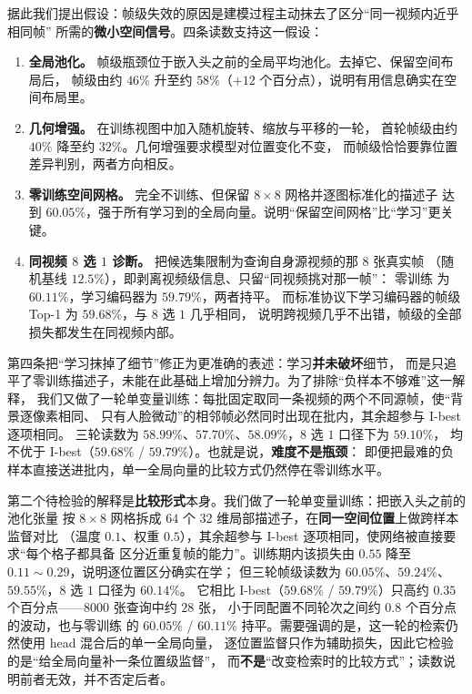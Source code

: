 据此我们提出假设：帧级失效的原因是建模过程主动抹去了区分“同一视频内近乎相同帧”
所需的\textbf{微小空间信号}。四条读数支持这一假设：

\begin{enumerate}[leftmargin=1.6em,itemsep=1pt]
\item \textbf{全局池化。} 帧级瓶颈位于嵌入头之前的全局平均池化。去掉它、保留空间布局后，
      帧级由约 $46\%$ 升至约 $58\%$（$+12$ 个百分点），说明有用信息确实在空间布局里。
\item \textbf{几何增强。} 在训练视图中加入随机旋转、缩放与平移的一轮，
      首轮帧级由约 $40\%$ 降至约 $32\%$。几何增强要求模型对位置变化不变，
      而帧级恰恰要靠位置差异判别，两者方向相反。
\item \textbf{零训练空间网格。} 完全不训练、但保留 $8\times8$ 网格并逐图标准化的描述子
      达到 $60.05\%$，强于所有学习到的全局向量。说明“保留空间网格”比“学习”更关键。
\item \textbf{同视频 $8$ 选 $1$ 诊断。} 把候选集限制为查询自身源视频的那 $8$ 张真实帧
      （随机基线 $12.5\%$），即剥离视频级信息、只留“同视频挑对那一帧”：
      零训练  为 $60.11\%$，学习编码器为 $59.79\%$，两者持平。
      而标准协议下学习编码器的帧级 Top-1 为 $59.68\%$，与 $8$ 选 $1$ 几乎相同，
      说明跨视频几乎不出错，帧级的全部损失都发生在同视频内部。
\end{enumerate}

第四条把“学习抹掉了细节”修正为更准确的表述：学习\textbf{并未破坏}细节，
而是只追平了零训练描述子，未能在此基础上增加分辨力。为了排除“负样本不够难”这一解释，
我们又做了一轮单变量训练：每批固定取同一条视频的两个不同源帧，使“背景逐像素相同、
只有人脸微动”的相邻帧必然同时出现在批内，其余超参与 I-best 逐项相同。
三轮读数为 $58.99\%$、$57.70\%$、$58.09\%$，$8$ 选 $1$ 口径下为 $59.10\%$，
均不优于 I-best（$59.68\%$ / $59.79\%$）。也就是说，\textbf{难度不是瓶颈}：
即便把最难的负样本直接送进批内，单一全局向量的比较方式仍然停在零训练水平。

第二个待检验的解释是\textbf{比较形式}本身。我们做了一轮单变量训练：把嵌入头之前的池化张量
按 $8\times8$ 网格拆成 $64$ 个 $32$ 维局部描述子，在\textbf{同一空间位置}上做跨样本监督对比
（温度 $0.1$、权重 $0.5$），其余超参与 I-best 逐项相同，使网络被直接要求“每个格子都具备
区分近重复帧的能力”。训练期内该损失由 $0.55$ 降至 $0.11\sim0.29$，说明逐位置区分确实在学；
但三轮帧级读数为 $60.05\%$、$59.24\%$、$59.55\%$，$8$ 选 $1$ 口径为 $60.14\%$。
它相比 I-best（$59.68\%$ / $59.79\%$）只高约 $0.35$ 个百分点——$8000$ 张查询中约 $28$ 张，
小于同配置不同轮次之间约 $0.8$ 个百分点的波动，也与零训练  的
$60.05\%$ / $60.11\%$ 持平。需要强调的是，这一轮的检索仍然使用 head 混合后的单一全局向量，
逐位置监督只作为辅助损失，因此它检验的是“给全局向量补一条位置级监督”，
而\textbf{不是}“改变检索时的比较方式”；读数说明前者无效，并不否定后者。

